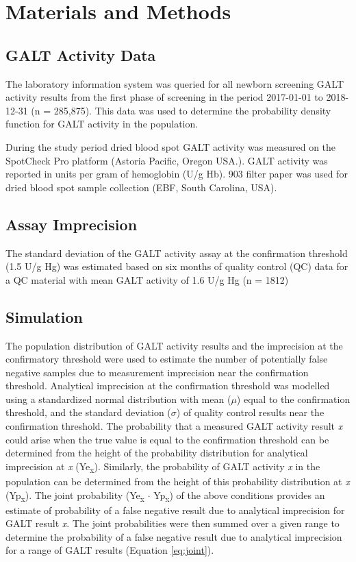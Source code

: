 \documentclass[review]{elsarticle}
\begin{document}
\section*{Materials and Methods}
\label{sec:org14a8757}
\subsection*{GALT Activity Data}
\label{sec:org5f5d0cf}
The laboratory information system was queried for all newborn
screening GALT activity results from the first phase of screening in
the period 2017-01-01 to 2018-12-31 (n = 285,875). This data was used
to determine the probability density function for GALT activity in the
population.

During the study period dried blood spot GALT activity was measured
on the SpotCheck Pro platform (Astoria Pacific, Oregon USA.). GALT
activity was reported in units per gram of hemoglobin (U/g Hb). 903
filter paper was used for dried blood spot sample collection (EBF,
South Carolina, USA).

\subsection*{Assay Imprecision}
\label{sec:orgec63d5b}
The standard deviation of the GALT activity assay at the confirmation
threshold (1.5 U/g Hg) was estimated based on six months of quality
control (QC) data for a QC material with mean GALT activity of 1.6 U/g
Hg (n = 1812)

\subsection*{Simulation}
\label{sec:org32e004b}
The population distribution of GALT activity results and the
imprecision at the confirmatory threshold were used to estimate the
number of potentially false negative samples due to measurement
imprecision near the confirmation threshold. Analytical imprecision at
the confirmation threshold was modelled using a standardized normal
distribution with mean (\(\mu\)) equal to the confirmation threshold, and
the standard deviation (\(\sigma\)) of quality control results near the
confirmation threshold. The probability that a measured GALT activity
result \emph{x} could arise when the true value is equal to the confirmation
threshold can be determined from the height of the probability
distribution for analytical imprecision at \emph{x} (Ye\textsubscript{x}). Similarly, the
probability of GALT activity \emph{x} in the population can be determined
from the height of this probability distribution at \emph{x} (Yp\textsubscript{x}). The
joint probability (Ye\textsubscript{x} \(\cdot\) Yp\textsubscript{x}) of the above conditions provides
an estimate of probability of a false negative result due to analytical
imprecision for GALT result \emph{x}. The joint probabilities were then
summed over a given range to determine the probability of a false
negative result due to analytical imprecision for a range of GALT
results (Equation \ref{eq:joint}).
\end{document}
